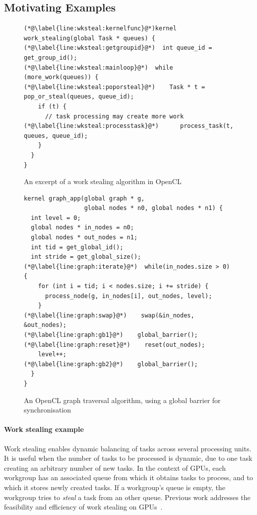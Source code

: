 \documentclass[numbers,nocopyrightspace,10pt]{sigplanconf}
\begin{document}
\subsection{Motivating Examples}\label{sec:openclexamples}

\begin{figure}

\begin{lstlisting}
(*@\label{line:wksteal:kernelfunc}@*)kernel work_stealing(global Task * queues) {
(*@\label{line:wksteal:getgroupid}@*)  int queue_id = get_group_id();
(*@\label{line:wksteal:mainloop}@*)  while (more_work(queues)) {
(*@\label{line:wksteal:poporsteal}@*)    Task * t = pop_or_steal(queues, queue_id);
    if (t) {
      // task processing may create more work
(*@\label{line:wksteal:processtask}@*)      process_task(t, queues, queue_id);
    }
  }
}
\end{lstlisting}

\caption{An excerpt of a work stealing algorithm in OpenCL}\label{fig:workstealing}
\end{figure}

\begin{figure}

\begin{lstlisting}
kernel graph_app(global graph * g, 
                 global nodes * n0, global nodes * n1) {
  int level = 0;
  global nodes * in_nodes = n0;
  global nodes * out_nodes = n1;
  int tid = get_global_id();
  int stride = get_global_size();
(*@\label{line:graph:iterate}@*)  while(in_nodes.size > 0) {
    for (int i = tid; i < nodes.size; i += stride) {
      process_node(g, in_nodes[i], out_nodes, level);
    }
(*@\label{line:graph:swap}@*)    swap(&in_nodes, &out_nodes);
(*@\label{line:graph:gb1}@*)    global_barrier();
(*@\label{line:graph:reset}@*)    reset(out_nodes);
    level++;
(*@\label{line:graph:gb2}@*)    global_barrier();
  }
}
\end{lstlisting}
\caption{An OpenCL graph traversal algorithm, using a global barrier for synchronisation}\label{fig:graphsearch}
\end{figure}

\paragraph{Work stealing example}
%
Work stealing enables dynamic balancing of tasks across several
processing units. It is useful when the number of tasks to be
processed is dynamic, due to one task creating an arbitrary number of new tasks.  In the context
of GPUs, each workgroup has an associated queue from which it
obtains tasks to process, and to which it stores newly created
tasks. If a workgroup's queue is empty, the workgroup tries to \emph{steal} a task from an other
queue. Previous work addresses the feasibility and efficiency of work
stealing on GPUs~\cite{DBLP:conf/egh/CedermanT08,TPO10}.
\end{document}
